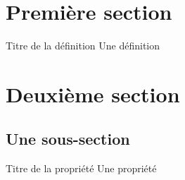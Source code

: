 \documentclass[11pt,a4paper,usenames,dvipsnames]{article}
\begin{document}
	
	
	\EnteteCours
	
	\section{Première section}
	
	\begin{definition}{Titre de la définition}{}
	 Une définition
	\end{definition}
	
	\section{Deuxième section}
    
    \subsection{Une sous-section}
    
    \begin{propriete}{Titre de la propriété}{}
	 Une propriété
	\end{propriete}

	
\end{document}
